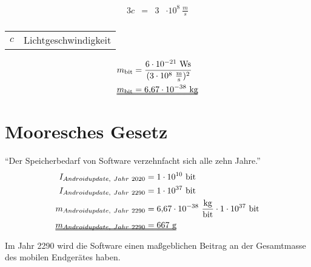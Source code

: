 \documentclass[aspectratio=169]{beamer}
\makeatletter
\newenvironment{conditions}
{\par\vspace{\abovedisplayskip}\noindent\begin{tabular}{>{$}l<{$} @{${}\hspace{0.1cm}.\hspace{0.03cm}.\hspace{0.25cm}{}$} l}}
	{\end{tabular}\par\vspace{\belowdisplayskip}}
\makeatother
\begin{document}
\centering\begin{frame}[fragile]{\insertsection}{\insertsubsection}
\begin{alignat}{3}
c & = & 3 & \cdot 10^{8}\ \unit{\frac{m}{s}}  \\
\end{alignat}
\begin{conditions}
	c & Lichtgeschwindigkeit \\
\end{conditions}
\end{frame}

\centering\begin{frame}[fragile]{\insertsection}{\insertsubsection}
\begin{alignat}{2}
m_{\unit{bit}} & = \frac{6 \cdot 10^{-21}\ \unit{Ws}}{(3\cdot 10^8\ \unit{\frac{m}{s}})^2} \\
\makebox[0pt][l]{\uuline{\phantom{$m_{\unit{bit}} = 6{,}67 \cdot 10^{-38}\ \unit{kg}$}}}
m_{\unit{bit}} & = 6{,}67 \cdot 10^{-38}\ \unit{kg}
\end{alignat}
\end{frame}

\section{Mooresches Gesetz}
\centering\begin{frame}[fragile]{\insertsection}{\insertsubsection}
"`Der Speicherbedarf von Software verzehnfacht sich alle zehn Jahre."'
\begin{alignat}{2}
I_{Androidupdate,\ Jahr\ 2020} & =  1  \cdot 10^{10}\ \unit{bit}  \\
I_{Androidupdate,\ Jahr\ 2290} & =  1  \cdot 10^{37}\ \unit{bit}  \\
m_{Androidupdate,\ Jahr\ 2290} & =  6{,}67  \cdot 10^{-38}\ \unit{\frac{kg}{bit}} \cdot 1 \cdot 10^{37}\ \unit{bit}  \\
\makebox[0pt][l]{\uuline{\phantom{$m_{Androidupdate,\ Jahr\ 2290} =  667\ \unit{g}$}}}
m_{Androidupdate,\ Jahr\ 2290} & =  667\ \unit{g}    \\
\end{alignat}
\end{frame}

\centering\begin{frame}[fragile]{\insertsection}{\insertsubsection}
Im Jahr 2290 wird die Software einen maßgeblichen Beitrag an der Gesamtmasse des mobilen Endgerätes haben. 


\end{frame}
\end{document}
